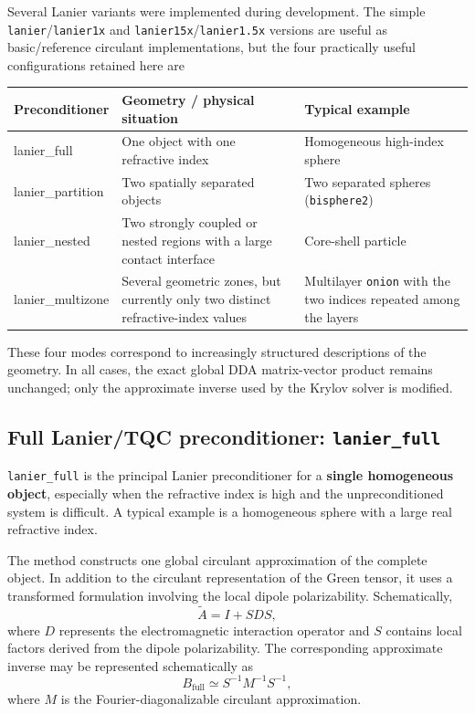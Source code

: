 \documentclass[11pt,a4paper]{article}
\begin{document}
Several Lanier variants were implemented during development. The simple \texttt{lanier}/\texttt{lanier1x} and \texttt{lanier15x}/\texttt{lanier1.5x} versions are useful as basic/reference circulant implementations, but the four practically useful configurations retained here are

\begin{center}
\begin{tabular}{>{\ttfamily}p{3.4cm} p{4.8cm} p{6.2cm}}
\toprule
\textnormal{Preconditioner} & \textnormal{Geometry / physical situation} & \textnormal{Typical example} \\
\midrule
lanier\_full & One object with one refractive index & Homogeneous high-index sphere \\
lanier\_partition & Two spatially separated objects & Two separated spheres (\texttt{bisphere2}) \\
lanier\_nested & Two strongly coupled or nested regions with a large contact interface & Core-shell particle \\
lanier\_multizone & Several geometric zones, but currently only two distinct refractive-index values & Multilayer \texttt{onion} with the two indices repeated among the layers \\
\bottomrule
\end{tabular}
\end{center}

These four modes correspond to increasingly structured descriptions of the geometry. In all cases, the exact global DDA matrix-vector product remains unchanged; only the approximate inverse used by the Krylov solver is modified.

\subsection{Full Lanier/TQC preconditioner: \texttt{lanier\_full}}

\texttt{lanier\_full} is the principal Lanier preconditioner for a \textbf{single homogeneous object}, especially when the refractive index is high and the unpreconditioned system is difficult. A typical example is a homogeneous sphere with a large real refractive index.

The method constructs one global circulant approximation of the complete object. In addition to the circulant representation of the Green tensor, it uses a transformed formulation involving the local dipole polarizability. Schematically,
\begin{equation}
\widetilde{A}=I+SDS,
\end{equation}
where \(D\) represents the electromagnetic interaction operator and \(S\) contains local factors derived from the dipole polarizability. The corresponding approximate inverse may be represented schematically as
\begin{equation}
B_{\mathrm{full}}\simeq S^{-1}M^{-1}S^{-1},
\end{equation}
where \(M\) is the Fourier-diagonalizable circulant approximation.
\end{document}
